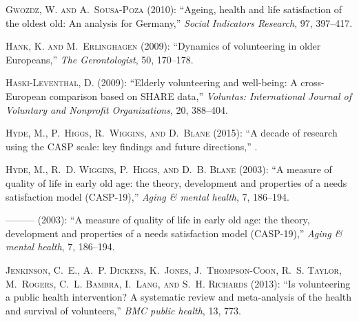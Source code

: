 \textsc{Gwozdz, W. and A.~Sousa-Poza} (2010): \enquote{Ageing, health and life
  satisfaction of the oldest old: An analysis for Germany,} \emph{Social
  Indicators Research}, 97, 397--417.

\textsc{Hank, K. and M.~Erlinghagen} (2009): \enquote{Dynamics of volunteering
  in older Europeans,} \emph{The Gerontologist}, 50, 170--178.

\textsc{Haski-Leventhal, D.} (2009): \enquote{Elderly volunteering and
  well-being: A cross-European comparison based on SHARE data,} \emph{Voluntas:
  International Journal of Voluntary and Nonprofit Organizations}, 20,
  388--404.

\textsc{Hyde, M., P.~Higgs, R.~Wiggins, and D.~Blane} (2015): \enquote{A decade
  of research using the CASP scale: key findings and future directions,} .

\textsc{Hyde, M., R.~D. Wiggins, P.~Higgs, and D.~B. Blane}
  (2003{}): \enquote{A measure of quality of life in early old age:
  the theory, development and properties of a needs satisfaction model
  (CASP-19),} \emph{Aging \& mental health}, 7, 186--194.

---\hspace{-.1pt}---\hspace{-.1pt}--- (2003{}): \enquote{A measure
  of quality of life in early old age: the theory, development and properties
  of a needs satisfaction model (CASP-19),} \emph{Aging \& mental health}, 7,
  186--194.

\textsc{Jenkinson, C.~E., A.~P. Dickens, K.~Jones, J.~Thompson-Coon, R.~S.
  Taylor, M.~Rogers, C.~L. Bambra, I.~Lang, and S.~H. Richards} (2013):
  \enquote{Is volunteering a public health intervention? A systematic review
  and meta-analysis of the health and survival of volunteers,} \emph{BMC public
  health}, 13, 773.

